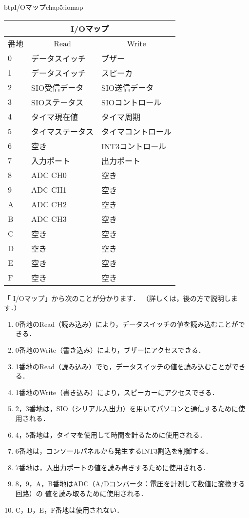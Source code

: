 \begin{mytable}{btp}{I/Oマップ}{chap5:iomap}
\small\begin{tabular}{| l | l | l |}
\hline
\multicolumn{3}{|c|}{I/Oマップ} \\
\hline
番地 & \multicolumn{1}{|c|}{Read} & \multicolumn{1}{|c|}{Write} \\
\hline
0 & データスイッチ   & ブザー \\
1 & データスイッチ   & スピーカ \\
2 & SIO受信データ    & SIO送信データ \\
3 & SIOステータス    & SIOコントロール \\
4 & タイマ現在値     & タイマ周期 \\
5 & タイマステータス & タイマコントロール \\
6 & 空き             & INT3コントロール \\
7 & 入力ポート       & 出力ポート \\
8 & ADC CH0          & 空き \\
9 & ADC CH1          & 空き \\
A & ADC CH2          & 空き \\
B & ADC CH3          & 空き \\
C & 空き             & 空き \\
D & 空き             & 空き \\
E & 空き             & 空き \\
F & 空き             & 空き \\
\hline
\end{tabular}
\end{mytable}

「 I/Oマップ」から次のことが分かります．
（詳しくは，後の方で説明します．）

\begin{enumerate}
\item 0番地のRead（読み込み）により，データスイッチの値を読み込むことができる．
\item 0番地のWrite（書き込み）により，ブザーにアクセスできる．
\item 1番地のRead（読み込み）でも，データスイッチの値を読み込むことができる．
\item 1番地のWrite（書き込み）により，スピーカーにアクセスできる．
\item 2，3番地は，SIO（シリアル入出力）を用いてパソコンと通信するために使用される．
\item 4，5番地は，タイマを使用して時間を計るために使用される．
\item 6番地は，コンソールパネルから発生するINT3割込を制御する．
\item 7番地は，入出力ポートの値を読み書きするために使用される．
\item 8，9，A，B番地はADC（A/Dコンバータ：電圧を計測して数値に変換する回路）の
値を読み取るために使用される．
\item C，D，E，F番地は使用されない．
\end{enumerate}

